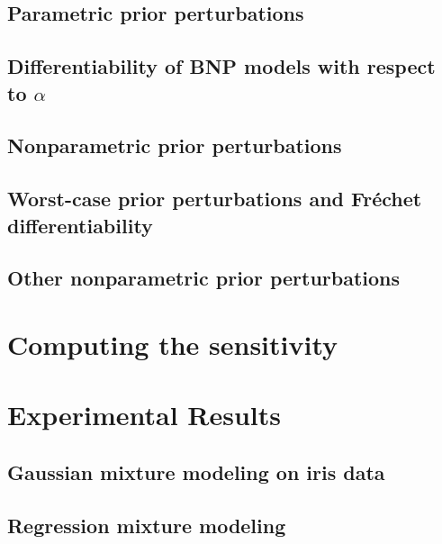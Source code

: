 \documentclass[11pt]{article}
\begin{document}
    \subsection{Parametric prior perturbations}
    

    \subsection{Differentiability of BNP models with respect to $\alpha$}
    

    \subsection{Nonparametric prior perturbations}
    

    \subsection{Worst-case prior perturbations and Fr{\'e}chet differentiability}
    

    \subsection{Other nonparametric prior perturbations}
    

\section{Computing the sensitivity}


\section{Experimental Results}


    \subsection{Gaussian mixture modeling on iris data}
    

    \subsection{Regression mixture modeling}
    
\end{document}

